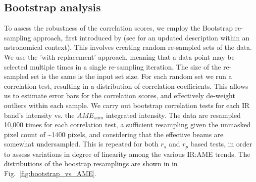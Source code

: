     \subsection{Bootstrap analysis}
        To assess the robustness of the correlation scores, we employ the Bootstrap re-sampling approach, first introduced by \cite{efron79} (see \cite{feigelson13} for an updated description within an astronomical context). This involves creating random re-sampled sets of the data. We use the 'with replacement' approach, meaning that a data point may be selected multiple times in a single re-sampling iteration. The size of the re-sampled set is the same is the input set size. For each random set we run a correlation test, resulting in a distribution of correlation coefficients. This allows us to estimate error bars for the correlation scores, and effectively de-weight outliers within each sample.
        We carry out bootstrap correlation tests for each IR band's intensity vs. the $AME_{sum}$ integrated intensity. The data are resampled 10,000 times for each correlation test, a sufficient resampling given the unmasked pixel count of \textasciitilde{}1400 pixels, and considering that the effective beams are somewhat undersampled. This is repeated for both $r_{s}$ and $r_{p}$ based tests, in order to assess variations in degree of linearity among the various IR:AME trends. The distributions of the boostrap resamplings are shown in in Fig.~\ref{fig:bootstrap_vs_AME}.
